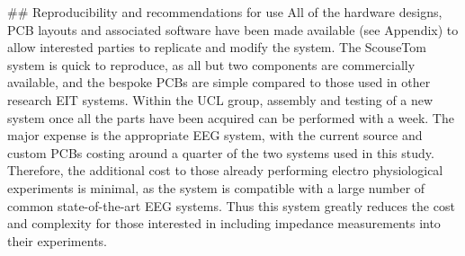 ## Reproducibility and recommendations for use
All of the hardware designs, PCB layouts and associated software have been made available (see Appendix) to allow interested parties to replicate and modify the system. The ScouseTom system is quick to reproduce, as all but two components are commercially available, and the bespoke PCBs are simple compared to those used in other research EIT systems. Within the UCL group, assembly and testing of a new system once all the parts have been acquired can be performed with a week. The major expense is the appropriate EEG system, with the current source and custom PCBs costing around a quarter of the two systems used in this study. Therefore, the additional cost to those already performing electro physiological experiments is minimal, as the system is compatible with  a large number of common state-of-the-art EEG systems. Thus this system greatly reduces the cost and complexity for those interested in including impedance measurements into their experiments.